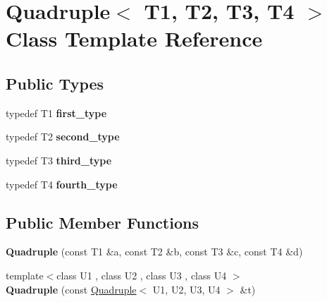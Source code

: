 \hypertarget{classQuadruple}{}\section{Quadruple$<$ T1, T2, T3, T4 $>$ Class Template Reference}
\label{classQuadruple}
\subsection*{Public Types}
\begin{DoxyCompactItemize}
\item 
\mbox{\label{classQuadruple_a887dcff9b9c940e36aaca129674e4080}} 
typedef T1 {\bfseries first\+\_\+type}
\item 
\mbox{\label{classQuadruple_ace05fbf5dfb3fbe3cac0eef1177a0d8f}} 
typedef T2 {\bfseries second\+\_\+type}
\item 
\mbox{\label{classQuadruple_a69eb64be88e77ad1fa3e9620379ce1c1}} 
typedef T3 {\bfseries third\+\_\+type}
\item 
\mbox{\label{classQuadruple_aa2e3f825a9922591a5b723491d42d078}} 
typedef T4 {\bfseries fourth\+\_\+type}
\end{DoxyCompactItemize}
\subsection*{Public Member Functions}
\begin{DoxyCompactItemize}
\item 
\mbox{\label{classQuadruple_a0a13f945436da5b1e526f2e9c34ce7a7}} 
{\bfseries Quadruple} (const T1 \&a, const T2 \&b, const T3 \&c, const T4 \&d)
\item 
\mbox{\label{classQuadruple_a755e6d5fa3343ca05bd1d5b5fd00ed8f}} 
{\footnotesize template$<$class U1 , class U2 , class U3 , class U4 $>$ }\\{\bfseries Quadruple} (const \hyperlink{classQuadruple}{Quadruple}$<$ U1, U2, U3, U4 $>$ \&t)
\end{DoxyCompactItemize}

